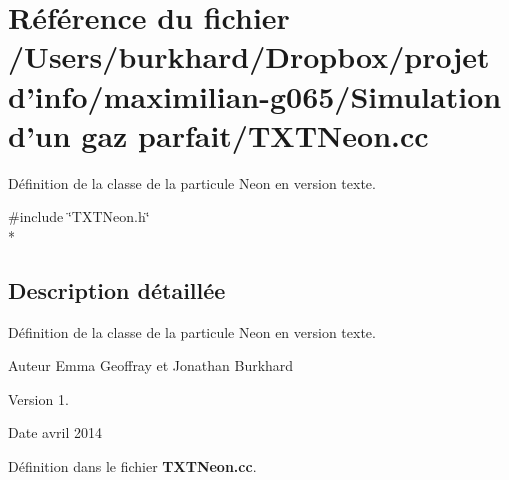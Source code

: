 \section{Référence du fichier /\+Users/burkhard/\+Dropbox/projet d'info/maximilian-\/g065/\+Simulation d'un gaz parfait/\+T\+X\+T\+Neon.cc}
\label{_t_x_t_neon_8cc}


Définition de la classe de la particule Neon en version texte.  


{\ttfamily \#include \char`\"{}T\+X\+T\+Neon.\+h\char`\"{}}\\*


\subsection{Description détaillée}
Définition de la classe de la particule Neon en version texte. 

\begin{DoxyAuthor}{Auteur}
Emma Geoffray et Jonathan Burkhard 
\end{DoxyAuthor}
\begin{DoxyVersion}{Version}
1. 
\end{DoxyVersion}
\begin{DoxyDate}{Date}
avril 2014 
\end{DoxyDate}


Définition dans le fichier {\bf T\+X\+T\+Neon.\+cc}.


